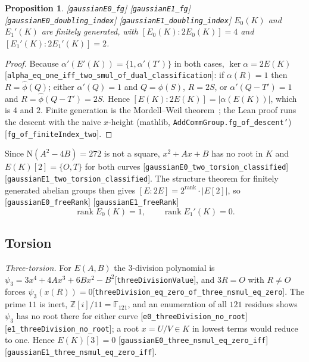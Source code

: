 \documentclass[10pt]{article}
\newtheorem{proposition}[theorem]{Proposition}
\theoremstyle{definition}
\theoremstyle{remark}
\newcommand{\Z}{\mathbb{Z}}
\newcommand{\F}{\mathbb{F}}
\newcommand{\Nm}{\mathrm{N}}
\newcommand{\Oinf}{O}
\newcommand{\leanref}[1]{{\scriptsize\textup{[\texttt{#1}]}}\allowbreak}
\begin{document}
\begin{proposition}\label{prop:mw}
\leanref{gaussian\allowbreak E0\_\allowbreak fg} \leanref{gaussian\allowbreak E1\_\allowbreak fg} \leanref{gaussian\allowbreak E0\_\allowbreak doubling\_\allowbreak index} \leanref{gaussian\allowbreak E1\_\allowbreak doubling\_\allowbreak index}
$E_0(K)$ and $E_1'(K)$ are finitely generated, with
$[E_0(K):2E_0(K)]=4$ and $[E_1'(K):2E_1'(K)]=2$.
\end{proposition}
\begin{proof}
Because $\alpha'(E'(K))=\{1,\alpha'(T')\}$ in both cases, $\ker\alpha=2E(K)$
\leanref{alpha\_\allowbreak eq\_\allowbreak one\_\allowbreak iff\_\allowbreak two\_\allowbreak smul\_\allowbreak of\_\allowbreak dual\_\allowbreak classification}: if $\alpha(R)=1$
then $R=\hat\phi(Q)$; either $\alpha'(Q)=1$ and $Q=\phi(S)$, $R=2S$, or
$\alpha'(Q-T')=1$ and $R=\hat\phi(Q-T')=2S$.  Hence
$[E(K):2E(K)]=|\alpha(E(K))|$, which is $4$ and $2$.  Finite generation is
the Mordell--Weil theorem~\cite[VIII.6.7]{Silverman}; the Lean proof runs the
descent with the naive $x$-height (mathlib,
\texttt{Add\allowbreak Comm\allowbreak Group.fg\_\allowbreak of\_\allowbreak descent'})\leanref{fg\_\allowbreak of\_\allowbreak finite\allowbreak Index\_\allowbreak two}.
\end{proof}

Since $\Nm(A^2-4B)=272$ is not a square, $x^2+Ax+B$ has no root in $K$ and
$E(K)[2]=\{\Oinf,T\}$ for both curves
\leanref{gaussian\allowbreak E0\_\allowbreak two\_\allowbreak torsion\_\allowbreak classified} \leanref{gaussian\allowbreak E1\_\allowbreak two\_\allowbreak torsion\_\allowbreak classified}.
The structure theorem for finitely generated abelian groups then gives
$[E:2E]=2^{\mathrm{rank}}\cdot|E[2]|$, so
\leanref{gaussian\allowbreak E0\_\allowbreak free\allowbreak Rank} \leanref{gaussian\allowbreak E1\_\allowbreak free\allowbreak Rank}
\[
 \operatorname{rank}E_0(K)=1,\qquad \operatorname{rank}E_1'(K)=0 .
\]

\subsection{Torsion}\label{sec:torsion}

\emph{Three-torsion.}  For $E(A,B)$ the $3$-division polynomial is
$\psi_3=3x^4+4Ax^3+6Bx^2-B^2$\leanref{three\allowbreak Division\allowbreak Value}, and $3R=\Oinf$ with
$R\ne\Oinf$ forces $\psi_3(x(R))=0$\leanref{three\allowbreak Division\_\allowbreak eq\_\allowbreak zero\_\allowbreak of\_\allowbreak three\_\allowbreak nsmul\_\allowbreak eq\_\allowbreak zero}.
The prime $11$ is inert, $\Z[i]/11=\F_{121}$, and an enumeration of all $121$
residues shows $\psi_3$ has no root there for either curve
\leanref{e0\_\allowbreak three\allowbreak Division\_\allowbreak no\_\allowbreak root} \leanref{e1\_\allowbreak three\allowbreak Division\_\allowbreak no\_\allowbreak root}; a root
$x=U/V\in K$ in lowest terms would reduce to one.  Hence $E(K)[3]=0$
\leanref{gaussian\allowbreak E0\_\allowbreak three\_\allowbreak nsmul\_\allowbreak eq\_\allowbreak zero\_\allowbreak iff} \leanref{gaussian\allowbreak E1\_\allowbreak three\_\allowbreak nsmul\_\allowbreak eq\_\allowbreak zero\_\allowbreak iff}.
\end{document}
